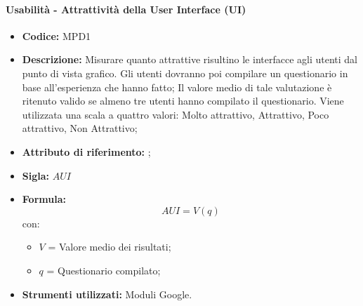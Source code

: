 \paragraph{Usabilità - Attrattività della User Interface (UI)} 
\begin{itemize}
    \item \textbf{Codice:} MPD1
    \item \textbf{Descrizione:} Misurare quanto attrattive risultino le interfacce agli utenti dal punto di vista grafico.
    Gli utenti dovranno poi compilare un questionario in base all'esperienza che hanno fatto;
    Il valore medio di tale valutazione è ritenuto valido se almeno tre utenti hanno compilato il questionario. 
    Viene utilizzata una scala a quattro valori: Molto attrattivo, Attrattivo, Poco attrattivo, Non Attrattivo;
    \item \textbf{Attributo di riferimento:} ;
    \item \textbf{Sigla:} $AUI$
    \item \textbf{Formula:}$$AUI = V(q) $$
    con:
        \begin{itemize}
        \item $V$ = Valore medio dei risultati;
        \item $q$ = Questionario compilato;
        \end{itemize}
    \item \textbf{Strumenti utilizzati:} Moduli Google.
\end{itemize}
